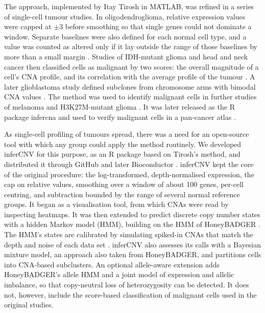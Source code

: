 The approach, implemented by Itay Tirosh in MATLAB, was refined in a series of single-cell tumour studies. In oligodendroglioma, relative expression values were capped at $\pm$3 before smoothing so that single genes could not dominate a window. Separate baselines were also defined for each normal cell type, and a value was counted as altered only if it lay outside the range of those baselines by more than a small margin \citep{tirosh2016oligo}. Studies of IDH-mutant glioma and head and neck cancer then classified cells as malignant by two scores: the overall magnitude of a cell's CNA profile, and its correlation with the average profile of the tumour \citep{venteicher2017, puram2017}. A later glioblastoma study defined subclones from chromosome arms with bimodal CNA values \citep{neftel2019}. The method was used to identify malignant cells in further studies of melanoma \citep{tirosh2016melanoma} and H3K27M-mutant glioma \citep{filbin2018}. It was later released as the R package infercna \citep{laffy_infercna} and used to verify malignant cells in a pan-cancer atlas \citep{gavish2023}.

As single-cell profiling of tumours spread, there was a need for an open-source tool with which any group could apply the method routinely. We developed inferCNV for this purpose, as an R package based on Tirosh's method, and distributed it through GitHub and later Bioconductor \citep{tickle2019infercnv, infercnvBioc}. inferCNV kept the core of the original procedure: the log-transformed, depth-normalised expression, the cap on relative values, smoothing over a window of about 100 genes, per-cell centring, and subtraction bounded by the range of several normal reference groups. It began as a visualisation tool, from which CNAs were read by inspecting heatmaps. It was then extended to predict discrete copy number states with a hidden Markov model (HMM), building on the HMM of HoneyBADGER \citep{fan2018}. The HMM's states are calibrated by simulating spiked-in CNAs that match the depth and noise of each data set \citep{haas2021thesis}. inferCNV also assesses its calls with a Bayesian mixture model, an approach also taken from HoneyBADGER, and partitions cells into CNA-based subclusters. An optional allele-aware extension adds HoneyBADGER's allele HMM and a joint model of expression and allelic imbalance, so that copy-neutral loss of heterozygosity can be detected. It does not, however, include the score-based classification of malignant cells used in the original studies.

